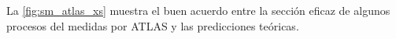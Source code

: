 




La {\fig} \ref{fig:sm_atlas_xs} muestra el buen acuerdo entre la sección eficaz de algunos
procesos del {\SM} medidas por ATLAS y las predicciones
teóricas.

